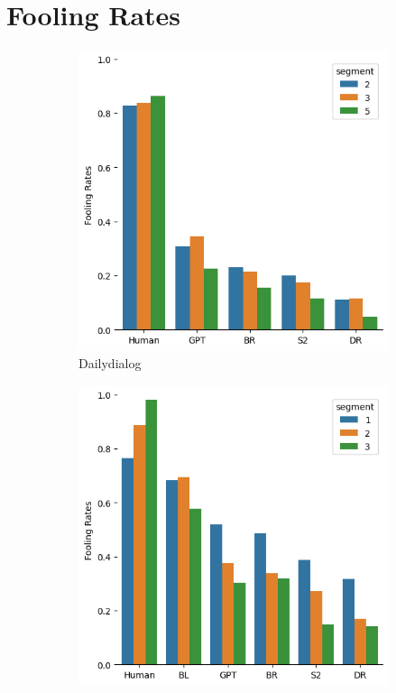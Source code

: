 \documentclass[11pt,a4paper]{article}
\begin{document}
\section{Fooling Rates}
\begin{figure}[h!]
  \begin{subfigure}[b]{0.3\textwidth}
    \includegraphics[width=\textwidth]{figures/dailydialog/fooling_rates_over_time.png}
    \caption{Dailydialog}
    \label{fig:1}
  \end{subfigure}
  \begin{subfigure}[b]{0.3\textwidth}
    \includegraphics[width=\textwidth]{figures/empathetic/fooling_rates_over_time.png}

\end{subfigure}
\end{figure}
\end{document}
